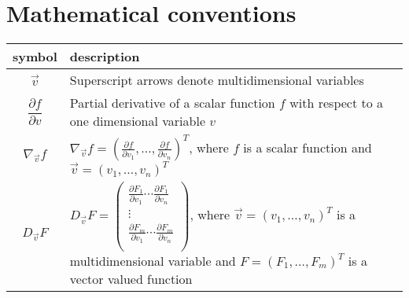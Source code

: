 \section*{Mathematical conventions}

\begin{table}[h!]
\centering
\begin{tabular}{c p{10cm}} %
\hline
symbol & description \\ \hline
$\vec{v}$ & Superscript arrows denote multidimensional variables \\[0.5em] 
$\dfrac{\partial f}{\partial v}$ & Partial derivative of a scalar function $f$ with respect to a one dimensional variable $v$ \\[0.5em] 
$\nabla_{\vec{v}} f$  & $\nabla_{\vec{v}} f = (\frac{\partial f}{\partial v_1}, \ldots, \frac{\partial f}{\partial v_n})^T$, where $f$ is a scalar function and $\vec{v} = (v_1, \ldots, v_n)^T$  \\[0.5em]
$D_{\vec{v}} F$ & $D_{\vec{v}} F = \begin{pmatrix}
    \frac{\partial F_1}{\partial v_1} \cdots \frac{\partial F_1}{\partial v_n} \\
    \vdots \\
    \frac{\partial F_m}{\partial v_1} \cdots \frac{\partial F_m}{\partial v_n} \\
\end{pmatrix}$, where $\vec{v} = (v_1, \ldots, v_n)^T$ is a multidimensional variable and $F = (F_1, \ldots, F_m)^T$ is a vector valued function \\
\hline
\end{tabular}
\end{table}